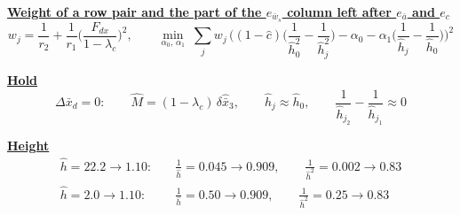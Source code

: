 \documentclass[11pt,a4paper]{ctexart}
\newcommand{\lc}{\lambda_c}
\newcommand{\bx}{\bar{x}}
\newcommand{\ba}{\bar{a}}
\newcommand{\bw}{\bar{w}}
\newcommand{\hh}{\hat{h}}
\newcommand{\ch}{\hat{c}}
\newcommand{\hd}[1]{\par\bigskip\noindent\underline{\textbf{#1}}}
\begin{document}
\hd{Weight of a row pair and the part of the $e_{\bw_s}$ column left after $e_{\ba}$ and $e_c$}
\[
w_j = \frac{1}{r_2} + \frac{1}{r_1}\Big(\frac{F_{dx}}{1-\lc}\Big)^{2}, \qquad
\min_{\alpha_0,\,\alpha_1}\;\sum_j w_j\,\Big((1-\ch)\Big(\frac{1}{\hh_0^{2}} - \frac{1}{\hh_j^{2}}\Big) - \alpha_0 - \alpha_1\Big(\frac{1}{\hh_j} - \frac{1}{\hh_0}\Big)\Big)^{2}
\]

\hd{Hold}
\[
\Delta\bx_d = 0:\qquad \hat{M} = (1-\lc)\,\delta\hat{\bx}_3, \qquad \hh_j \approx \hh_0, \qquad
\frac{1}{\hh_{j_2}} - \frac{1}{\hh_{j_1}} \approx 0
\]

\hd{Height}
\[
\begin{aligned}
\hh = 22.2 \to 1.10:&\quad \frac{1}{\hh} = 0.045 \to 0.909, \qquad \frac{1}{\hh^{2}} = 0.002 \to 0.83 \\
\hh = 2.0 \to 1.10:&\quad \frac{1}{\hh} = 0.50 \to 0.909, \qquad \frac{1}{\hh^{2}} = 0.25 \to 0.83
\end{aligned}
\]
\end{document}
